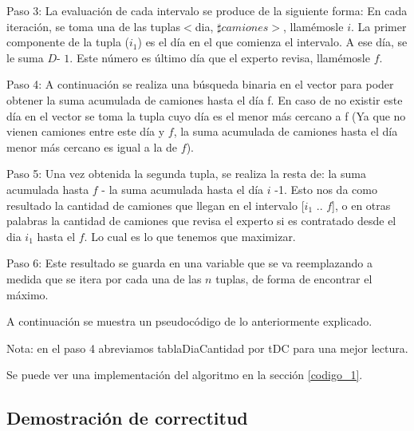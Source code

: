 \vspace{2mm}

 Paso 3: La evaluaci\'on de cada intervalo se produce de la siguiente forma: En cada iteraci\'on, se toma una de las tuplas$<$dia, $\sharp camiones>$, llam\'emosle $i$. La primer componente de la tupla ($i_1$)  es el d\'ia en el que comienza el intervalo. A ese d\'ia, se le suma $D$- $1$. Este n\'umero es \'ultimo d\'ia que el experto revisa, llam\'emosle $f$. 
 
 \vspace{2mm}

Paso 4: A continuaci\'on se realiza una b\'usqueda binaria en el vector para poder obtener la suma acumulada de camiones hasta el d\'ia f. En caso de no existir este d\'ia en el vector se toma la tupla cuyo d\'ia es el menor m\'as cercano a f (Ya que no vienen camiones entre este d\'ia y $f$, la suma acumulada de camiones hasta el d\'ia menor m\'as cercano es igual a la de $f$).
\vspace{2mm}

Paso 5: Una vez obtenida la segunda tupla, se realiza la resta de: la suma acumulada hasta $f$ - la suma acumulada hasta el d\'ia $i$ -1. Esto nos da como resultado la cantidad de camiones que llegan en el intervalo [$i_1$ .. $f$], o en otras palabras la cantidad de camiones que revisa el experto si es contratado desde el dia $i_1$ hasta el $f$. Lo cual es lo que tenemos que maximizar.

\vspace{2mm}

Paso 6: Este resultado se guarda en una variable que se va reemplazando a medida que se itera por cada una de las $n$ tuplas, de forma de encontrar el m\'aximo.

\vspace{2mm}

A continuaci\'on se muestra un pseudoc\'odigo de lo anteriormente explicado.

\vspace{20mm}



Nota: en el paso 4 abreviamos tablaDiaCantidad por tDC para una mejor lectura.

Se puede ver una implementaci\'on del algoritmo en la secci\'on \ref{codigo_1}.

\subsection{Demostraci\'on de correctitud}

